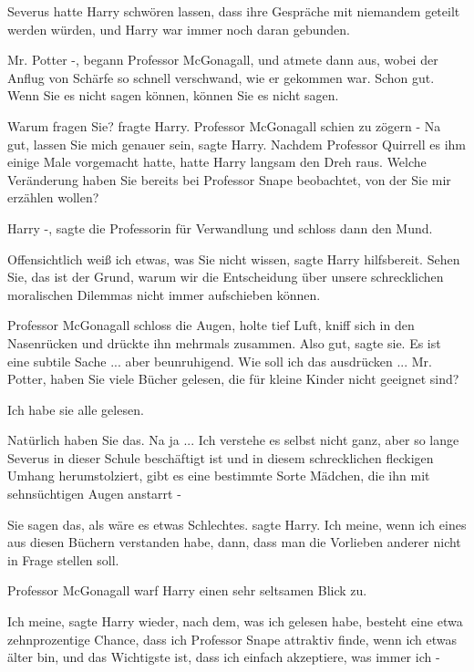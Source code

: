 Severus hatte Harry schwören lassen, dass ihre Gespräche mit niemandem geteilt
werden würden, und Harry war immer noch daran gebunden.

\glqq{}Mr. Potter -\grqq{}, begann Professor McGonagall, und atmete dann aus,
wobei der Anflug von Schärfe so schnell verschwand, wie er gekommen war. \glqq{}
Schon gut. Wenn Sie es nicht sagen können, können Sie es nicht sagen.\grqq{}

\glqq{}Warum fragen Sie?\grqq{} fragte Harry. Professor McGonagall schien zu
zögern - \glqq{}Na gut, lassen Sie mich genauer sein\grqq{}, sagte Harry. Nachdem
Professor Quirrell es ihm einige Male vorgemacht hatte, hatte Harry langsam den
Dreh raus. \glqq{}Welche Veränderung haben Sie bereits bei Professor Snape
beobachtet, von der Sie mir erzählen wollen?\grqq{}

\glqq{}Harry -\grqq{}, sagte die Professorin für Verwandlung und schloss dann den
Mund.

\glqq{}Offensichtlich weiß ich etwas, was Sie nicht wissen\grqq{}, sagte Harry
hilfsbereit. \glqq{}Sehen Sie, das ist der Grund, warum wir die Entscheidung über
unsere schrecklichen moralischen Dilemmas nicht immer aufschieben können.\grqq{}

Professor McGonagall schloss die Augen, holte tief Luft, kniff sich in den
Nasenrücken und drückte ihn mehrmals zusammen. \glqq{}Also gut\grqq{}, sagte sie.
\glqq{}Es ist eine subtile Sache ... aber beunruhigend. Wie soll ich das
ausdrücken ... Mr. Potter, haben Sie viele Bücher gelesen, die für kleine Kinder
nicht geeignet sind?\grqq{}

\glqq{}Ich habe sie alle gelesen.\grqq{}

\glqq{}Natürlich haben Sie das. Na ja ... Ich verstehe es selbst nicht ganz, aber
so lange Severus in dieser Schule beschäftigt ist und in diesem schrecklichen
fleckigen Umhang herumstolziert, gibt es eine bestimmte Sorte Mädchen, die ihn
mit sehnsüchtigen Augen anstarrt -\grqq{}

\glqq{}Sie sagen das, als wäre es etwas Schlechtes.\grqq{} sagte Harry. \glqq{}Ich
meine, wenn ich eines aus diesen Büchern verstanden habe, dann, dass man die
Vorlieben anderer nicht in Frage stellen soll.\grqq{}

Professor McGonagall warf Harry einen sehr seltsamen Blick zu.

\glqq{}Ich meine\grqq{}, sagte Harry wieder, \glqq{}nach dem, was ich gelesen
habe, besteht eine etwa zehnprozentige Chance, dass ich Professor Snape
attraktiv finde, wenn ich etwas älter bin, und das Wichtigste ist, dass ich
einfach akzeptiere, was immer ich -\grqq{}

